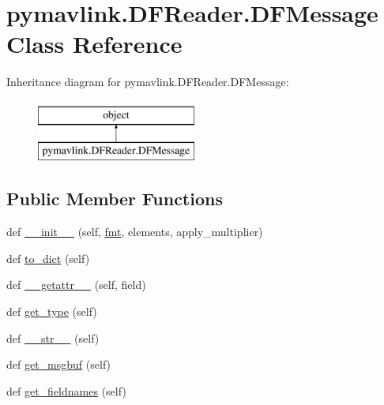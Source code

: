 \hypertarget{classpymavlink_1_1DFReader_1_1DFMessage}{}\section{pymavlink.\+D\+F\+Reader.\+D\+F\+Message Class Reference}
\label{classpymavlink_1_1DFReader_1_1DFMessage}
Inheritance diagram for pymavlink.\+D\+F\+Reader.\+D\+F\+Message\+:\begin{figure}[H]
\begin{center}
\leavevmode
\includegraphics[height=2.000000cm]{classpymavlink_1_1DFReader_1_1DFMessage}
\end{center}
\end{figure}
\subsection*{Public Member Functions}
\begin{DoxyCompactItemize}
\item 
def \mbox{\hyperlink{classpymavlink_1_1DFReader_1_1DFMessage_a783e0f90a8f515f7f7e7205a4a3c36c5}{\+\_\+\+\_\+init\+\_\+\+\_\+}} (self, \mbox{\hyperlink{classpymavlink_1_1DFReader_1_1DFMessage_a8f37e80929b490f8f9914e5c01fc7800}{fmt}}, elements, apply\+\_\+multiplier)
\item 
def \mbox{\hyperlink{classpymavlink_1_1DFReader_1_1DFMessage_abedd59fd89e788b1fb7b00cadf540754}{to\+\_\+dict}} (self)
\item 
def \mbox{\hyperlink{classpymavlink_1_1DFReader_1_1DFMessage_aeda9e43b0ace0421511eacc1b8701464}{\+\_\+\+\_\+getattr\+\_\+\+\_\+}} (self, field)
\item 
def \mbox{\hyperlink{classpymavlink_1_1DFReader_1_1DFMessage_ad59991dfc317e0c1db4390ef99a31f1a}{get\+\_\+type}} (self)
\item 
def \mbox{\hyperlink{classpymavlink_1_1DFReader_1_1DFMessage_a51f01505f918b49aaa444c8a83410fc7}{\+\_\+\+\_\+str\+\_\+\+\_\+}} (self)
\item 
def \mbox{\hyperlink{classpymavlink_1_1DFReader_1_1DFMessage_ab3d2d7f301462cc0343798a3d6486d8a}{get\+\_\+msgbuf}} (self)
\item 
def \mbox{\hyperlink{classpymavlink_1_1DFReader_1_1DFMessage_a6419df98bd311797fb1a24ee517b8483}{get\+\_\+fieldnames}} (self)
\end{DoxyCompactItemize}
